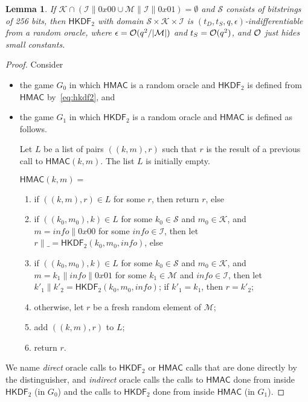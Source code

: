 \documentclass[compsoc, conference, letterpaper, 10pt, times]{IEEEtran}
\newcommand{\HKDF}{\mathsf{HKDF}}
\newtheorem{lemma}{Lemma}
\newcommand{\hkdftwo}{\HKDF_2}
\newcommand{\info}{\mathit{info}}
\newcommand{\hmac}{\mathsf{HMAC}}
\newcommand{\Ssalt}{\mathcal{S}}
\newcommand{\Skey}{\mathcal{K}}
\newcommand{\Sinfo}{\mathcal{I}}
\newcommand{\Smac}{\mathcal{M}}
\begin{document}
\begin{lemma}\label{lem:hkdfindif}
If $\Skey \cap (\Sinfo \| 0x00 \cup \Smac \| \Sinfo \| 0x01) = \emptyset$
and $\Ssalt$ consists of bitstrings of 256 bits,
then $\hkdftwo$ with domain $\Ssalt \times \Skey \times \Sinfo$ is
$(t_D, t_S, q, \epsilon)$-indifferentiable from a random oracle,
where $\epsilon = {\cal O}(q^2/|\Smac|)$ and $t_S = {\cal O}(q^2)$,
and ${\cal O}$ just hides small constants.
\end{lemma}
\begin{proof}
Consider
\begin{itemize}[leftmargin=*]
\item  the game $G_0$ in which $\hmac$ is a random oracle and $\hkdftwo$ is 
defined from $\hmac$ by~\eqref{eq:hkdf2}, and
\item the game $G_1$ in which $\hkdftwo$ is a random oracle and $\hmac$ is
defined as follows.

Let $L$ be a list of pairs $((k,m),r)$ such that $r$ is the result of a previous call
to $\hmac(k,m)$. The list $L$ is initially empty.

$\hmac(k,m) =$
\begin{enumerate}[leftmargin=*]
\item\label{step:previousresult} if $((k,m),r) \in L$ for some $r$, then return $r$, else
\item\label{step:firsthalf} if $((k_0,m_0),k) \in L$ for some $k_0 \in \Ssalt$ and $m_0 \in \Skey$, 
and $m = \info \|0x00$ for some $\info \in \Sinfo$,
then let $r \|\_ = \hkdftwo(k_0,m_0,\info)$, else
\item\label{step:secondhalf} if $((k_0,m_0),k) \in L$ for some $k_0 \in \Ssalt$ and $m_0 \in \Skey$, 
and $m = k_1 \| \info \|0x01$ for some $k_1 \in \Smac$ and $\info \in \Sinfo$,
then let $k'_1 \| k'_2 =  \hkdftwo(k_0,m_0,\info)$;
if $k'_1 = k_1$, then $r = k'_2$;
\item\label{step:fresh} otherwise, let $r$ be a fresh random element of $\Smac$;
\item\label{step:add} add $((k,m),r)$ to $L$;
\item\label{step:return} return $r$.
\end{enumerate}

\end{itemize}
We name \emph{direct} oracle calls to $\hkdftwo$ or $\hmac$ calls 
that are done directly by the distinguisher, and \emph{indirect} oracle calls
the calls to $\hmac$ done from inside $\hkdftwo$ (in $G_0$) and 
the calls to $\hkdftwo$ done from inside $\hmac$ (in $G_1$).


\end{proof}
\end{document}
